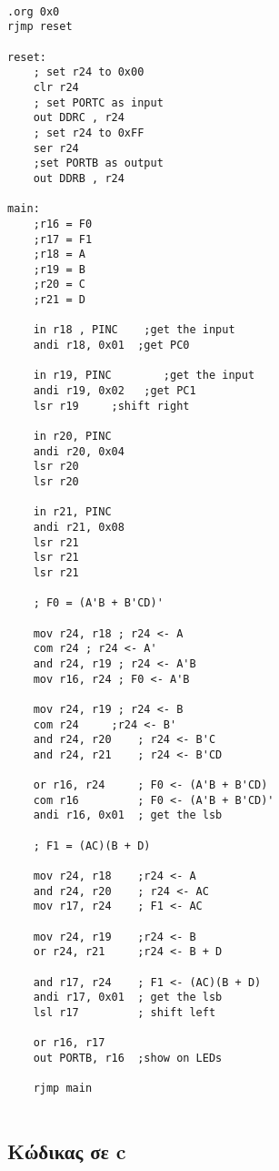 \documentclass[11pt]{article}
\begin{document}
\begin{verbatim}

.org 0x0
rjmp reset

reset:
	; set r24 to 0x00
	clr r24
	; set PORTC as input
	out DDRC , r24
	; set r24 to 0xFF
	ser r24
	;set PORTB as output
	out DDRB , r24

main:
	;r16 = F0
	;r17 = F1
	;r18 = A
	;r19 = B
	;r20 = C
	;r21 = D

	in r18 , PINC	 ;get the input
	andi r18, 0x01	;get PC0

	in r19, PINC	    ;get the input
	andi r19, 0x02	 ;get PC1
	lsr r19		;shift right

	in r20, PINC
	andi r20, 0x04
	lsr r20
	lsr r20

	in r21, PINC
	andi r21, 0x08
	lsr r21
	lsr r21
	lsr r21

	; F0 = (A'B + B'CD)'

	mov r24, r18 ; r24 <- A
	com r24 ; r24 <- A'
	and r24, r19 ; r24 <- A'B
	mov r16, r24 ; F0 <- A'B

	mov r24, r19 ; r24 <- B
	com r24		;r24 <- B'
	and r24, r20	; r24 <- B'C
	and r24, r21	; r24 <- B'CD

	or r16, r24		; F0 <- (A'B + B'CD)
	com r16			; F0 <- (A'B + B'CD)'
	andi r16, 0x01	; get the lsb

	; F1 = (AC)(B + D)

	mov r24, r18	;r24 <- A
	and r24, r20	; r24 <- AC
	mov r17, r24	; F1 <- AC

	mov r24, r19	;r24 <- B
	or r24, r21		;r24 <- B + D

	and r17, r24	; F1 <- (AC)(B + D)
	andi r17, 0x01	; get the lsb
	lsl r17			; shift left

	or r16, r17
	out PORTB, r16	;show on LEDs

	rjmp main
	
\end{verbatim}

\subsection*{Κώδικας σε c}
\end{document}
